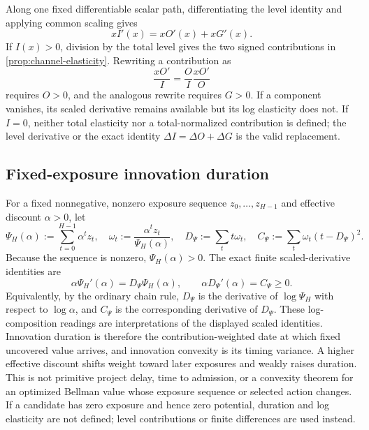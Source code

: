 Along one fixed differentiable scalar path, differentiating the level identity
and applying common scaling gives
\[
 xI'(x)=xO'(x)+xG'(x).
\]
If \(I(x)>0\), division by the total level gives the two signed
contributions in \cref{prop:channel-elasticity}.  Rewriting a contribution as
\[
 \frac{xO'}I=\frac OI\frac{xO'}O
\]
requires \(O>0\), and the analogous rewrite requires \(G>0\).  If a component
vanishes, its scaled derivative remains available but its log elasticity
does not.  If \(I=0\), neither total elasticity nor a total-normalized
contribution is defined; the level derivative or the exact identity
\(\Delta I=\Delta O+\Delta G\) is the valid replacement.

\begin{table}[ht]
\centering
\scriptsize
\setlength{\tabcolsep}{2.5pt}

\caption{Exact productive value, channel levels, and fixed-policy discount
elasticity in the canonical benchmark.  The \(D_\beta\) column is not an
application of the finite fixed-exposure duration theorem.  A dash explicitly
marks an undefined ordinary component elasticity at a zero component level;
it is never recorded as zero.  Scaled contributions are evaluated directly.}
\label{tab:canonical-channel-elasticities}
\end{table}

\subsection{Fixed-exposure innovation duration}

For a fixed nonnegative, nonzero exposure sequence
\(z_0,\ldots,z_{H-1}\) and effective discount \(\alpha>0\), let
\begin{equation}\label{eq:innovation-potential-duration}
 \Psi_H(\alpha):=\sum_{t=0}^{H-1}\alpha^tz_t,
 \quad \omega_t:=\frac{\alpha^tz_t}{\Psi_H(\alpha)},
 \quad D_\Psi:=\sum_t t\omega_t,
 \quad C_\Psi:=\sum_t\omega_t(t-D_\Psi)^2.
\end{equation}
Because the sequence is nonzero, \(\Psi_H(\alpha)>0\).  The exact finite
scaled-derivative identities are
\begin{equation}
 \alpha\Psi_H'(\alpha)=D_\Psi\Psi_H(\alpha),
 \qquad
 \alpha D_\Psi'(\alpha)=C_\Psi\ge0.
 \label{eq:innovation-duration}
\end{equation}
Equivalently, by the ordinary chain rule, \(D_\Psi\) is the derivative of
\(\log\Psi_H\) with respect to \(\log\alpha\), and \(C_\Psi\) is the
corresponding derivative of \(D_\Psi\).  These log-composition readings are
interpretations of the displayed scaled identities.  Innovation duration is
therefore the contribution-weighted date at which fixed uncovered value
arrives, and innovation convexity is its timing variance.  A higher effective
discount shifts weight toward later exposures and weakly raises duration.
This is not primitive project delay, time to admission, or a convexity theorem
for an optimized Bellman value whose exposure sequence or selected action
changes.  If a candidate has zero exposure and hence zero potential, duration
and log elasticity are not defined; level contributions or finite differences
are used instead.


